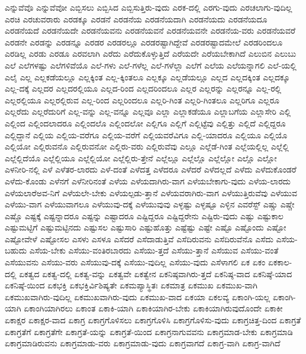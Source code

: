 {ಎನ್ನುವೆವೊ
ಎನ್ನುವೆವೋ
ಎಬ್ಬಿಸಲು
ಎಬ್ಬಿಸಿದ
ಎಬ್ಬಿಸುತ್ತಿರು-ವುದು
ಎರಕ-ದಲ್ಲಿ
ಎರಗು-ವುದು
ಎರಚಲಾಗು-ವುದಿಲ್ಲ
ಎರಚಿ
ಎರಚುವರಾರು
ಎರಡಕ್ಕೂ
ಎರಡನೆ
ಎರಡನೆಯ
ಎರಡನೆಯದಾಗಿ
ಎರಡನೆಯದು
ಎರಡನೆಯದೂ
ಎರಡನೆಯದೆ
ಎರಡನೆಯದೇ
ಎರಡನೆಯವನು
ಎರಡನೆಯವನೆ
ಎರಡನೆಯವನೇ
ಎರಡನೆಯ-ವರು
ಎರಡನೆಯವರೆ
ಎರಡನೇ
ಎರಡನ್ನು
ಎರಡನ್ನೂ
ಎರಡರ
ಎರಡರಲ್ಲೂ
ಎರಡರಷ್ಟಾಗಿದ್ದೇವೆ
ಎರಡರಷ್ಟಾದಮೇಲೆ
ಎರಡರಿಂದಲೂ
ಎರಡಿಲ್ಲ
ಎರಡು
ಎರಡೂ
ಎರವಲಾಗಿ
ಎರೆದು
ಎರೆದುಕೊಳ್ಳುತ್ತಿದೆ
ಎರೆಯದೇ
ಎರೆಯಬೇಕಾಗಿದೆ
ಎಲುಬಿನ
ಎಲುಬು
ಎಲೆ
ಎಲೆಗಳಷ್ಟು
ಎಲೆಗಳಿವೆಯೊ
ಎಲೆ-ಗಳು
ಎಲೆ-ಗಳೆಲ್ಲ
ಎಲೆ-ಗಳೆಲ್ಲಾ
ಎಲೆಗೆ
ಎಲೆಯ
ಎಲೆಯನ್ನಾಗಲಿ
ಎಲೆ-ಯಲ್ಲಿ
ಎಲೈ
ಎಲ್ಲ
ಎಲ್ಲಕಡೆಯಲ್ಲೂ
ಎಲ್ಲಕ್ಕಿಂತ
ಎಲ್ಲ-ಕ್ಕಿಂತಲೂ
ಎಲ್ಲಕ್ಕೂ
ಎಲ್ಲಡೆಯಲ್ಲೂ
ಎಲ್ಲದ
ಎಲ್ಲದಕ್ಕಿಂತ
ಎಲ್ಲದಕ್ಕೂ
ಎಲ್ಲ-ದಕ್ಕೆ
ಎಲ್ಲದರ
ಎಲ್ಲದರಲ್ಲಿಯೂ
ಎಲ್ಲದ-ರಿಂದ
ಎಲ್ಲದರಿಂದಲೂ
ಎಲ್ಲರ
ಎಲ್ಲರನ್ನು
ಎಲ್ಲರನ್ನೂ
ಎಲ್ಲ-ರಲ್ಲಿ
ಎಲ್ಲರಲ್ಲಿಯೂ
ಎಲ್ಲರಲ್ಲಿರುವ
ಎಲ್ಲ-ರಿಂದ
ಎಲ್ಲರಿಂದಲೂ
ಎಲ್ಲರಿ-ಗಿಂತ
ಎಲ್ಲರಿ-ಗಿಂತಲೂ
ಎಲ್ಲರಿಗೂ
ಎಲ್ಲರೂ
ಎಲ್ಲರೆದು
ಎಲ್ಲರೆದುರಿಗೆ
ಎಲ್ಲ-ವನ್ನು
ಎಲ್ಲ-ವನ್ನೂ
ಎಲ್ಲವೂ
ಎಲ್ಲಾ
ಎಲ್ಲಾಕಡೆಯೂ
ಎಲ್ಲಾಬಗೆಯ
ಎಲ್ಲಾಸೇರಿ
ಎಲ್ಲಿ
ಎಲ್ಲಿಂದ
ಎಲ್ಲಿಂದಲಾದರೂ
ಎಲ್ಲಿಂದಲೊ
ಎಲ್ಲಿಂದಲೋ
ಎಲ್ಲಿಗೂ
ಎಲ್ಲಿಗೆ
ಎಲ್ಲಿಟ್ಟೆವು
ಎಲ್ಲಿತ್ತು
ಎಲ್ಲಿದೆ
ಎಲ್ಲಿದ್ದರೂ
ಎಲ್ಲಿದ್ದಾನೆ
ಎಲ್ಲಿಯ
ಎಲ್ಲಿಯ-ವರೆಗೂ
ಎಲ್ಲಿಯ-ವರೆಗೆ
ಎಲ್ಲಿಯವರೆವಿಗೂ
ಎಲ್ಲಿ-ಯಾದರೂ
ಎಲ್ಲಿಯೂ
ಎಲ್ಲಿಯೊ
ಎಲ್ಲಿಯೋ
ಎಲ್ಲಿರುವನೊ
ಎಲ್ಲಿರುವನೋ
ಎಲ್ಲಿರು-ವರು
ಎಲ್ಲಿರುವೆವು
ಎಲ್ಲೂ
ಎಲ್ಲೆಡೆ-ಗಿಂತ
ಎಲ್ಲೆಯಲ್ಲಿಲ್ಲ
ಎಲ್ಲೆಲ್ಲಿ
ಎಲ್ಲೆಲ್ಲಿದೆಯೊ
ಎಲ್ಲೆಲ್ಲಿಯೂ
ಎಲ್ಲೆಲ್ಲಿಯೋ
ಎಲ್ಲೆಲ್ಲಿರು-ತ್ತೇನೆ
ಎಲ್ಲೆಲ್ಲೂ
ಎಲ್ಲೆಲ್ಲೊ
ಎಲ್ಲೆಲ್ಲೋ
ಎಲ್ಲೊ
ಎಲ್ಲೋ
ಎಳನೀರಿ-ನಲ್ಲಿ
ಎಳೆ
ಎಳೆತರ-ಲಾರದು
ಎಳೆ-ದಂತೆ
ಎಳೆದತ್ತ
ಎಳೆದರೂ
ಎಳೆದರೆ
ಎಳೆದಲ್ಲದೆ
ಎಳೆದು
ಎಳೆದುಕೊಂಡರೆ
ಎಳೆದು-ಕೊಂಡು
ಎಳೆನಗೆ
ಎಳೆನೀರಿನಂತೆ
ಎಳೆಯ
ಎಳೆಯದಾಗಿರು-ವಾಗ
ಎಳೆಯಬೇಕಾಗು-ವುದು
ಎಳೆಯ-ಲಾರದು
ಎಳೆಯಲಾರೆಅವ-ನಿಗೆ
ಎಳೆಯಲೇ-ಬೇಕು
ಎಳೆಯಲ್ಪಡು-ತ್ತಾನೆ
ಎಳೆಯವರಾಗಿರು-ವಾಗ
ಎಳೆಯುತ್ತಿರುವೆವು
ಎಳೆಯುವ
ಎಳೆಯು-ವಾಗ
ಎಳೆಯುವಾಗಲೂ
ಎಳೆಯುವು-ದಕ್ಕೆ
ಎಳೆಯುವುವು
ಎಳ್ಳಷ್ಟು
ಎಳ್ಳಷ್ಟೂ
ಎಳ್ಳಿನ
ಎವರೆಸ್ಟ್
ಎಷ್ಚು
ಎಷ್ಚೇ
ಎಷ್ಚೊ
ಎಷ್ಟಕ್ಕೆ
ಎಷ್ಟನ್ನಾದರೂ
ಎಷ್ಟನ್ನು
ಎಷ್ಟಾದರೂ
ಎಷ್ಟಿದ್ದರೂ
ಎಷ್ಟಿದ್ದರೇನು
ಎಷ್ಟಿರು-ವುದು
ಎಷ್ಟು
ಎಷ್ಟುಕಾಲ
ಎಷ್ಟುಮಟ್ಟಿಗೆ
ಎಷ್ಟುಮಟ್ಟಿನದು
ಎಷ್ಟುಸಲ
ಎಷ್ಟುಸಾರಿ
ಎಷ್ಟುಹೊತ್ತು
ಎಷ್ಟೆಷ್ಟು
ಎಷ್ಟೇ
ಎಷ್ಟೊ
ಎಷ್ಟೊಂದು
ಎಷ್ಟೋ
ಎಷ್ಟೋವೇಳೆ
ಎಷ್ಟೋಸಲ
ಎಸಳು
ಎಸಳೂ
ಎಸೆದರೆ
ಎಸೆದಾಡುತ್ತಿವೆ
ಎಸೆದಿರುವನು
ಎಸೆದಿರುವೆನೊ
ಎಸೆದು
ಎಸೆಯ-ಬಹುದು
ಎಸೆಯ-ಬೇಕು
ಎಸೆಯು-ವಂತಿರಬಾರದು
ಎಸೆಯು-ತ್ತದೆ
ಎಸೆಯು-ತ್ತಾನೆ
ಎಸೆಯುವ
ಎಸೆಯು-ವಂತೆ
ಎಸೆಯುವನು
ಎಸೆಯು-ವರು
ಎಸೆಯುವು-ದಕ್ಕೆ
ಎಸೆಯು-ವುದಿಲ್ಲ
ಎಸೆಯು-ವುದು
ಎಸೆಳಾಗಲಿ
ಏಕ
ಏಕಂ
ಏಕಕಾಲ-ದಲ್ಲಿ
ಏಕತ್ವದ
ಏಕತ್ವ-ದಲ್ಲಿ
ಏಕತ್ವ-ವನ್ನು
ಏಕತ್ವವೇ
ಏಕತ್ವೇನ
ಏಕನಿಷ್ಠವಾಗಿರು-ತ್ತದೆ
ಏಕನಿಷ್ಠ-ವಾದ
ಏಕನಿಷ್ಠೆ-ಯಾದ
ಏಕನಿಷ್ಠೆ-ಯಿಂದ
ಏಕಭಕ್ತಿ
ಏಕಭಕ್ತಿರ್ವಿಶಿಷ್ಯತೇ
ಏಕಮಪ್ಯಾಸ್ಥಿತಃ
ಏಕಮಾತ್ರ
ಏಕಮುಖ
ಏಕಮುಖ-ವಾಗಿ
ಏಕಮುಖವಾಗಿರು-ವುದಿಲ್ಲ
ಏಕಮುಖವಾಗಿರು-ವುದು
ಏಕಮುಖ-ವಾದ
ಏಕಯಾ
ಏಕಲವ್ಯ
ಏಕಾಂಗಿ-ಯಲ್ಲ
ಏಕಾಂಗಿ-ಯಾಗಿ
ಏಕಾಂಗಿಯಾಗಿರಲು
ಏಕಾಂತ
ಏಕಾಕಿ-ಯಾಗಿ
ಏಕಾಕಿಯಾಗಿರ-ಬೇಕು
ಏಕಾಕಿಯಾಗಿರುವುದೊಂದೇ
ಏಕಾಕೀ
ಏಕಾಕ್ಷರ
ಏಕಾಕ್ಷರ-ವಾದ
ಏಕಾಗ್ರ
ಏಕಾಗ್ರಗೊಳಿಸಲು
ಏಕಾಗ್ರಗೊಳಿಸಿ
ಏಕಾಗ್ರಗೊಳಿಸು-ವುದು
ಏಕಾಗ್ರಚಿತ್ತ-ದಿಂದ
ಏಕಾಗ್ರತೆ
ಏಕಾಗ್ರತೆಗೆ
ಏಕಾಗ್ರತೆಗೇ
ಏಕಾಗ್ರತೆ-ಯನ್ನು
ಏಕಾಗ್ರತೆ-ಯಿಂದ
ಏಕಾಗ್ರನಾಗುವವನು
ಏಕಾಗ್ರಮಾಡ-ಬೇಕು
ಏಕಾಗ್ರಮಾಡಿ
ಏಕಾಗ್ರಮಾಡಿರುವನು
ಏಕಾಗ್ರಮಾಡು-ವರು
ಏಕಾಗ್ರಮಾಡು-ವುದು
ಏಕಾಗ್ರವಾಗದೆ
ಏಕಾಗ್ರ-ವಾಗಿ
ಏಕಾಗ್ರ-ವಾಗಿದೆ
}

